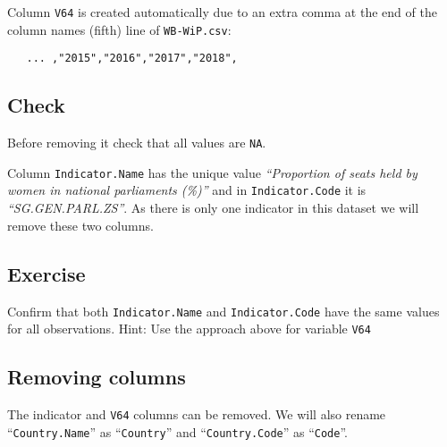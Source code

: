 \documentclass[a4paper,9pt,twocolumn,twoside,printwatermark=false]{pinp}
\begin{document}
Column \texttt{V64} is created automatically due to an extra comma at
the end of the column names (fifth) line of \texttt{WB-WiP.csv}:

\begin{verbatim}
   ... ,"2015","2016","2017","2018",
\end{verbatim}

\subsection{Check}\label{check}

Before removing it check that all values are \texttt{NA}.

\begin{Shaded}
\begin{Highlighting}[]
\end{Highlighting}
\end{Shaded}

Column \texttt{Indicator.Name} has the unique value \emph{``Proportion
of seats held by women in national parliaments (\%)''} and in
\texttt{Indicator.Code} it is \emph{``SG.GEN.PARL.ZS''}. As there is
only one indicator in this dataset we will remove these two columns.

\subsection{Exercise}\label{exercise-2}

Confirm that both \texttt{Indicator.Name} and \texttt{Indicator.Code}
have the same values for all observations. Hint: Use the approach above
for variable \texttt{V64}

\subsection{Removing columns}\label{removing-columns}

The indicator and \texttt{V64} columns can be removed. We will also
rename ``\texttt{Country.Name}'' as ``\texttt{Country}'' and
``\texttt{Country.Code}'' as ``\texttt{Code}''.

\begin{Shaded}
\begin{Highlighting}[]
\NormalTok{wip[, }\NormalTok{(}\NormalTok{, }\NormalTok{, }
        \NormalTok{)}\OperatorTok{:}\ErrorTok{=}\NormalTok{]}
\NormalTok{(}\NormalTok{, }\NormalTok{), }
              \NormalTok{(}\NormalTok{, }\NormalTok{))}
\NormalTok{(}
\NormalTok{(}
\end{Highlighting}
\end{Shaded}
\end{document}
